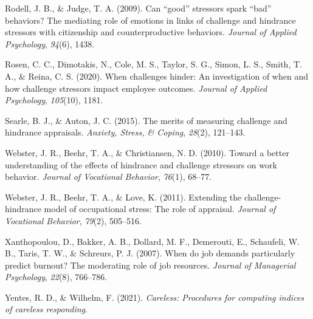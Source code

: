 \documentclass[
  man,mask]{apa7}
\newlength{\cslhangindent}
\newlength{\cslentryspacingunit} %
\newenvironment{CSLReferences}[2] %
 {%
  \setlength{\parindent}{0pt}
  \ifodd #1
  \let\oldpar\par
  \def\par{\hangindent=\cslhangindent\oldpar}
  \fi
  \setlength{\parskip}{#2\cslentryspacingunit}
 }%
 {}
\begin{document}
\begin{CSLReferences}{1}{0}
\leavevmode{}%
Rodell, J. B., \& Judge, T. A. (2009). Can {``good''} stressors spark {``bad''} behaviors? The mediating role of emotions in links of challenge and hindrance stressors with citizenship and counterproductive behaviors. \emph{Journal of Applied Psychology}, \emph{94}(6), 1438.

\leavevmode{}%
Rosen, C. C., Dimotakis, N., Cole, M. S., Taylor, S. G., Simon, L. S., Smith, T. A., \& Reina, C. S. (2020). When challenges hinder: An investigation of when and how challenge stressors impact employee outcomes. \emph{Journal of Applied Psychology}, \emph{105}(10), 1181.

\leavevmode{}%
Searle, B. J., \& Auton, J. C. (2015). The merits of measuring challenge and hindrance appraisals. \emph{Anxiety, Stress, \& Coping}, \emph{28}(2), 121--143.

\leavevmode{}%
Webster, J. R., Beehr, T. A., \& Christiansen, N. D. (2010). Toward a better understanding of the effects of hindrance and challenge stressors on work behavior. \emph{Journal of Vocational Behavior}, \emph{76}(1), 68--77.

\leavevmode{}%
Webster, J. R., Beehr, T. A., \& Love, K. (2011). Extending the challenge-hindrance model of occupational stress: The role of appraisal. \emph{Journal of Vocational Behavior}, \emph{79}(2), 505--516.

\leavevmode{}%
Xanthopoulou, D., Bakker, A. B., Dollard, M. F., Demerouti, E., Schaufeli, W. B., Taris, T. W., \& Schreurs, P. J. (2007). When do job demands particularly predict burnout? The moderating role of job resources. \emph{Journal of Managerial Psychology}, \emph{22}(8), 766--786.

\leavevmode{}%
Yentes, R. D., \& Wilhelm, F. (2021). \emph{Careless: Procedures for computing indices of careless responding}.

\end{CSLReferences}

\endgroup
\end{document}
